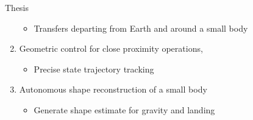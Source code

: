\begin{frame}{Thesis}
\begin{enumerate}
            \begin{itemize}
                \item Transfers departing from Earth and around a small body
            \end{itemize}
            \pause
        \item Geometric control for close proximity operations,
            \begin{itemize}
                \item Precise state trajectory tracking 
            \end{itemize}
            \pause
        \item  Autonomous shape reconstruction of a small body
            \begin{itemize}
                \item Generate shape estimate for gravity and landing 
            \end{itemize}
    \end{enumerate}
    
\end{frame}



